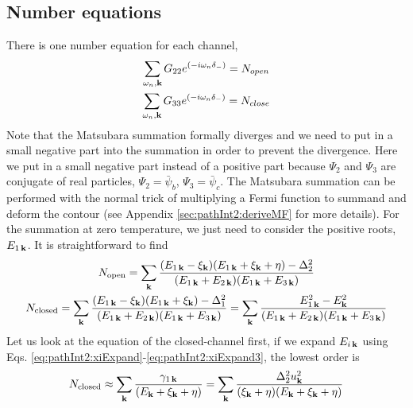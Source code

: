 \begin{unsure}
\subsection{Number equations}
There is one  number equation for each channel,  
\begin{gather*}
\sum_{\omega_{n}, \mathbf{k}}G_{22}e^{(-i\omega_n\delta_-)}=N_{open}\\
\sum_{\omega_{n},\mathbf{k}}G_{33}e^{(-i\omega_n\delta_-)}=N_{close}
\end{gather*}
Note that the Matsubara summation  formally diverges and we need to put in a small negative part into the summation in order to prevent the divergence.  Here we put in a small  negative part instead of a positive part  because $\Psi_{2}$ and $\Psi_{3}$ are conjugate of real particles, $\Psi_2=\bar\psi_b$, $\Psi_3=\bar\psi_c$.  The Matsubara summation can be performed with the normal trick of multiplying a Fermi function to summand and deform the contour  (see Appendix \ref{sec:pathInt2:deriveMF} for more details).  For the summation at zero temperature, we just need to consider the positive roots, $E_{1\,\mathbf{k}}$.  It is straightforward to find 
\begin{gather}
N_{\text{open}}=\sum_{\mathbf{k}}\frac{(E_{1\,\mathbf{k}}-\xi_{\mathbf{k}})(E_{1\,\mathbf{k}}+\xi_{\mathbf{k}}+\eta)-\Delta_2^2}{(E_{1\,\mathbf{k}}+E_{2\,\mathbf{k}})(E_{1\,\mathbf{k}}+E_{3\,\mathbf{k}})}
\label{eq:pathInt2:numOpen}\\
N_{\text{closed}}=\sum_{\mathbf{k}}\frac{(E_{1\,\mathbf{k}}-\xi_{\mathbf{k}})(E_{1\,\mathbf{k}}+\xi_{\mathbf{k}})-\Delta_1^2}{(E_{1\,\mathbf{k}}+E_{2\,\mathbf{k}})(E_{1\,\mathbf{k}}+E_{3\,\mathbf{k}})}
=\sum_{\mathbf{k}}\frac{E_{1\,\mathbf{k}}^2-E_{\mathbf{k}}^2}{(E_{1\,\mathbf{k}}+E_{2\,\mathbf{k}})(E_{1\,\mathbf{k}}+E_{3\,\mathbf{k}})}\label{eq:pathInt2:numClose}
\end{gather}
Let us look at the equation of the closed-channel first, if we expand $E_{i\,\mathbf{k}}$ using Eqs. \ref{eq:pathInt2:xiExpand}-\ref{eq:pathInt2:xiExpand3}, the lowest order is 
\begin{equation}\label{eq:pathInt2:closeD1}
N_{\text{closed}}\approx\sum_{\mathbf{k}}\frac{\gamma_{1\,\mathbf{k}}}{(E_{\mathbf{k}}+\xi_{\mathbf{k}}+\eta)}=\sum_{\mathbf{k}}\frac{\Delta_{2}^2u_{\mathbf{k}}^{2}}{(\xi_{\mathbf{k}}+\eta)(E_{\mathbf{k}}+\xi_{\mathbf{k}}+\eta)}
\end{equation}

\end{unsure}
